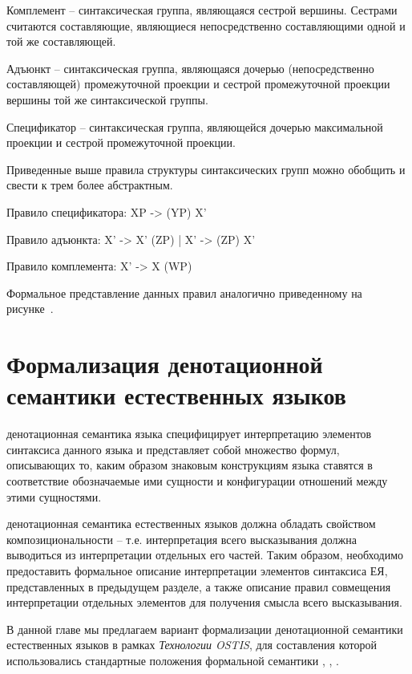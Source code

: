 Комплемент -- синтаксическая группа, являющаяся сестрой вершины.
Сестрами считаются составляющие, являющиеся непосредственно составляющими одной и той же составляющей.

Адъюнкт -- синтаксическая группа, являющаяся дочерью (непосредственно составляющей) промежуточной проекции и сестрой промежуточной проекции вершины той же синтаксической группы.

Спецификатор -- синтаксическая группа, являющейся дочерью максимальной проекции и сестрой промежуточной проекции.

Приведенные выше правила структуры синтаксических групп можно обобщить и свести к трем более абстрактным.

Правило спецификатора: XP -> (YP) X'

Правило адъюнкта: X' -> X' (ZP) | X' -> (ZP) X'

Правило комплемента: X' -> X (WP)

Формальное представление данных правил аналогично приведенному на рисунке~\textit{}.

\section{Формализация денотационной семантики естественных языков}
\label{section_natural_language_denotational_semantics_formalization}

денотационная семантика языка специфицирует интерпретацию элементов синтаксиса данного языка и представляет собой множество формул, описывающих то, каким образом знаковым конструкциям языка ставятся в соответствие обозначаемые ими сущности и конфигурации отношений между этими сущностями.

денотационная семантика естественных языков должна обладать свойством композициональности -- т.е. интерпретация всего высказывания должна выводиться из интерпретации отдельных его частей.
Таким образом, необходимо предоставить формальное описание интерпретации элементов синтаксиса ЕЯ, представленных в предыдущем разделе, а также описание правил совмещения интерпретации отдельных элементов для получения смысла всего высказывания.

В данной главе мы предлагаем вариант формализации денотационной семантики естественных языков в рамках \textit{Технологии OSTIS}, для составления которой использовались стандартные положения формальной семантики , , .

